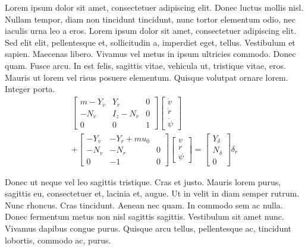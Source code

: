 \documentclass[a5paper]{article}
\begin{document}
\thispagestyle{empty}

Lorem ipsum dolor sit amet, consectetuer adipiscing elit. Donec luctus 
mollis nisl. Nullam tempor, diam non tincidunt tincidunt, nunc tortor 
elementum odio, nec iaculis urna leo a eros. Lorem ipsum dolor sit amet,
consectetuer adipiscing elit. Sed elit elit, pellentesque et, 
sollicitudin a, imperdiet eget, tellus. Vestibulum et sapien. Maecenas 
libero. Vivamus vel metus in ipsum ultricies commodo. Donec quam. Fusce 
arcu. In est felis, sagittis vitae, vehicula ut, tristique vitae, eros. 
Mauris ut lorem vel risus posuere elementum. Quisque volutpat ornare lorem. 
Integer porta.
\begin{multline}\label{eq:steeringfull}
    \begin{bmatrix}
        m-Y_{\dot{v}} & Y_{\dot{r}} & 0\\
        -N_{\dot{v}} & I_z-N_{\dot{r}} & 0\\
        0 & 0 & 1
    \end{bmatrix}
    \begin{bmatrix}
        \dot{v} \\ \dot{r}\\ \dot{\psi}
    \end{bmatrix}\\ +
    \begin{bmatrix}
        -Y_v & -Y_r+mu_0\\
        -N_v & -N_r & 0\\
        0 & -1 & 0
    \end{bmatrix}
    \begin{bmatrix}
        v \\ r \\ \psi
    \end{bmatrix} =
    \begin{bmatrix}
        Y_\delta \\ N_\delta \\ 0
    \end{bmatrix}\delta_r
\end{multline}

Donec ut neque vel leo sagittis tristique. Cras et justo. Mauris lorem 
purus, sagittis eu, consectetuer et, lacinia et, augue. Ut in velit in 
diam semper rutrum. Nunc rhoncus. Cras tincidunt. Aenean nec quam. In commodo
sem ac nulla. Donec fermentum metus non nisl sagittis sagittis. Vestibulum 
sit amet nunc. Vivamus dapibus congue purus. Quisque arcu tellus, 
pellentesque ac, tincidunt lobortis, commodo ac, purus.
\end{document}
